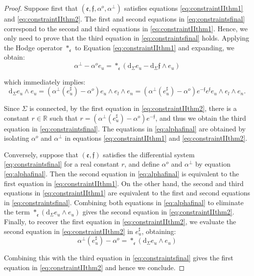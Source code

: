 \documentclass[10pt,reqno,a4paper]{amsart}
\theoremstyle{plain}
\theoremstyle{definition}
\theoremstyle{remark}
\theoremstyle{remark}
\def\dd{\mathrm{d}}
\def\fre{\mathfrak{e}}
\renewcommand{\(}{ (}
\renewcommand{\)}{ )}
\newcommand{\frf}{\mathfrak{f}}
\begin{document}
\begin{proof}
Suppose first that $(\fre,\frf,\alpha^o,\alpha^{\perp})$ satisfies equations \eqref{eq:constraintIIthm1} and \eqref{eq:constraintIIthm2}. The first and second equations in \eqref{eq:constraintsfinal} correspond to the second and third equations in \eqref{eq:constraintIIthm1}. Hence, we only need to prove that the third equation in \eqref{eq:constraintsfinal} holds. Applying the Hodge operator $\ast_{\fre}$ to Equation \eqref{eq:constraintIIthm1} and expanding, we obtain:
\begin{equation*}
\alpha^{\perp}-\alpha^o e_u = \ast_{\fre} (\dd_{\Sigma}e_u-\dd_{\Sigma}\frf\wedge e_u)
\end{equation*}

\noindent
which immediately implies: 
\begin{equation*}
\dd_{\Sigma}e_u\wedge e_u = (\alpha^{\perp}(e^{\sharp}_{u})-\alpha^o ) e_u\wedge e_l\wedge e_n = (\alpha^{\perp}(e^{\sharp}_{u})-\alpha^o ) e^{-\frf} e^{\frf} e_u\wedge e_l\wedge e_n.
\end{equation*}

\noindent
Since $\Sigma$ is connected, by the first equation in \eqref{eq:constraintIIthm2}, there is a constant $r\in\mathbb R$ such that $r = (\alpha^{\perp}(e^{\sharp}_{u})-\alpha^o ) e^{-\frf}$, and thus we obtain the third equation in \eqref{eq:constraintsfinal}. The equations in \eqref{eq:alphafinal} are obtained by isolating $\alpha^o$ and $\alpha^{\perp}$ in equations \eqref{eq:constraintIIthm1} and \eqref{eq:constraintIIthm2}. 

\noindent
Conversely, suppose that $(\fre,\frf)$ satisfies the differential system \eqref{eq:constraintsfinal} for a real constant $r$, and define $\alpha^o$ and $\alpha^{\perp}$ by equation \eqref{eq:alphafinal}. Then the second equation in \eqref{eq:alphafinal} is equivalent to the first equation in \eqref{eq:constraintIIthm1}. On the other hand, the second and third equations in \eqref{eq:constraintIIthm1} are equivalent to the first and second equations in \eqref{eq:constraintsfinal}. Combining both equations in \eqref{eq:alphafinal} to eliminate the term $\ast_{\fre}(\dd_{\Sigma} e_u \wedge e_u)$ gives the second equation in \eqref{eq:constraintIIthm2}. Finally, to recover the first equation in \eqref{eq:constraintIIthm2}, we evaluate the second equation in \eqref{eq:constraintIIthm2} in $e^{\sharp}_u$, obtaining:
\begin{equation*}
    \alpha^{\perp}(e^{\sharp}_u) - \alpha^o = \ast_{\fre} (\dd_{\Sigma} e_u \wedge e_u)
\end{equation*}

\noindent
Combining this with the third equation in \eqref{eq:constraintsfinal} gives the first equation in \eqref{eq:constraintIIthm2} and hence we conclude.
\end{proof}
\end{document}
